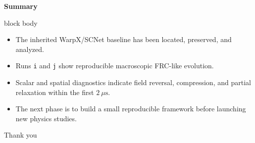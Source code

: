 \documentclass[aspectratio=169,11pt]{beamer}
\begin{document}
\begin{frame}[plain]
    \vspace{1.0cm}
    {\color{myblue}\Large\bfseries Summary}\par
    \vspace{0.35cm}

    \begin{beamercolorbox}[wd=0.94\textwidth,rounded=true,sep=0.75em]{block body}
    \small
    \begin{itemize}\setlength\itemsep{0.16cm}
        \item The inherited WarpX/SCNet baseline has been located, preserved, and analyzed.
        \item Runs \texttt{i} and \texttt{j} show reproducible macroscopic FRC-like evolution.
        \item Scalar and spatial diagnostics indicate field reversal, compression, and partial relaxation within the first \(2~\mu\mathrm{s}\).
        \item The next phase is to build a small reproducible framework before launching new physics studies.
    \end{itemize}
    \end{beamercolorbox}

    \vfill
    {\centering\large Thank you\par}
    \vspace{0.6cm}
\end{frame}
\end{document}
